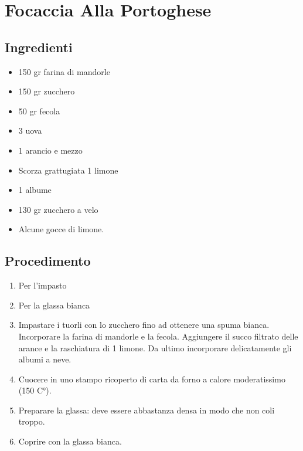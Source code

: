 \section{Focaccia Alla Portoghese}
\subsection{Ingredienti}
\begin{itemize}
\item 150 gr farina di mandorle  
\item 150 gr zucchero  
\item 50 gr fecola  
\item 3 uova  
\item 1 arancio e mezzo  
\item Scorza grattugiata 1 limone  
\item 1 albume  
\item 130 gr zucchero a velo  
\item Alcune gocce di limone.
\end{itemize}
\subsection{Procedimento}
\begin{enumerate}
\item  Per l'impasto  
\item  Per la glassa bianca  
\item  Impastare i tuorli con lo zucchero fino ad ottenere una spuma bianca. Incorporare la farina di mandorle e la fecola. Aggiungere il succo filtrato delle arance e la raschiatura di 1 limone. Da ultimo incorporare delicatamente gli albumi a neve.   
\item  Cuocere in uno stampo ricoperto di carta da forno a calore moderatissimo (150 C°).  
\item  Preparare la glassa: deve essere abbastanza densa in modo che non coli troppo.  
\item  Coprire con la glassa bianca.
\end{enumerate}
